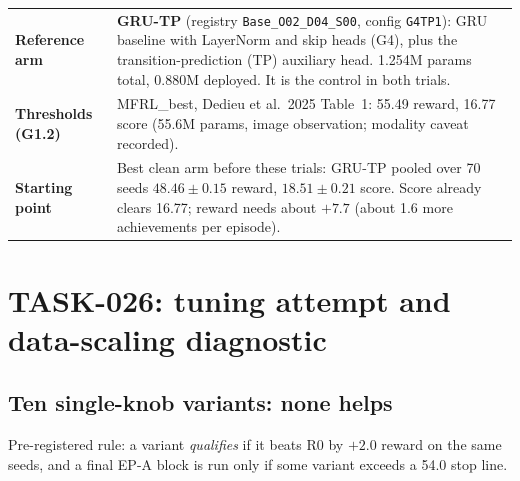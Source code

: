 \documentclass[10pt,a4paper]{article}
\newcommand{\p}[1]{\texttt{\small #1}}
\begin{document}
\begin{center}\small
\begin{tabular}{@{}p{4.1cm}p{11.8cm}@{}}\toprule
\textbf{Reference arm} & \textbf{GRU-TP} (registry \p{Base\_O02\_D04\_S00}, config \p{G4TP1}): GRU baseline with LayerNorm and skip heads (G4), plus the transition-prediction (TP) auxiliary head. 1.254M params total, 0.880M deployed. It is the control in both trials.\\
\textbf{Thresholds (G1.2)} & MFRL\_best, Dedieu et al.\ 2025 Table~1: 55.49 reward, 16.77 score (55.6M params, image observation; modality caveat recorded). \\
\textbf{Starting point} & Best clean arm before these trials: GRU-TP pooled over 70 seeds $48.46\pm0.15$ reward, $18.51\pm0.21$ score. Score already clears 16.77; reward needs about $+7.7$ (about 1.6 more achievements per episode).\\\bottomrule
\end{tabular}
\end{center}

\section{TASK-026: tuning attempt and data-scaling diagnostic}\label{sec:t026}

\subsection{Ten single-knob variants: none helps}
Pre-registered rule: a variant \emph{qualifies} if it beats R0 by $+2.0$ reward on the same seeds, and a final EP-A block is run only if some variant exceeds a 54.0 stop line.
\end{document}
